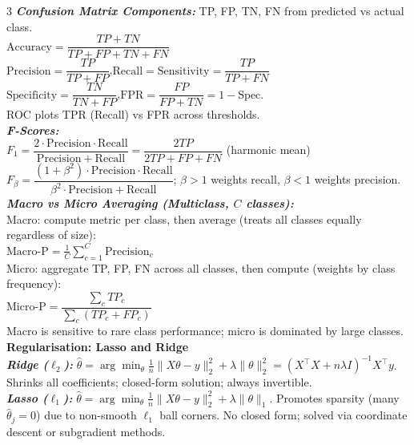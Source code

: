 \documentclass[a4paper,7pt]{article}
\begin{document}
\begin{multicols*}{3}
\textit{\textbf{Confusion Matrix Components:}} TP, FP, TN, FN from predicted vs actual class.\\
$\mathrm{Accuracy}=\dfrac{TP+TN}{TP+FP+TN+FN}$\\
$\mathrm{Precision}=\dfrac{TP}{TP+FP}$,\quad $\mathrm{Recall}=\mathrm{Sensitivity}=\dfrac{TP}{TP+FN}$\\
$\mathrm{Specificity}=\dfrac{TN}{TN+FP}$,\quad $\mathrm{FPR}=\dfrac{FP}{FP+TN}=1-\mathrm{Spec.}$\\
ROC plots TPR (Recall) vs FPR across thresholds.\\

\textit{\textbf{F-Scores:}}\\
$F_1=\dfrac{2\cdot\mathrm{Precision}\cdot\mathrm{Recall}}{\mathrm{Precision}+\mathrm{Recall}}=\dfrac{2TP}{2TP+FP+FN}$ (harmonic mean)\\
$F_\beta=\dfrac{(1+\beta^2)\cdot\mathrm{Precision}\cdot\mathrm{Recall}}{\beta^2\cdot\mathrm{Precision}+\mathrm{Recall}}$; $\beta>1$ weights recall, $\beta<1$ weights precision.\\

\textit{\textbf{Macro vs Micro Averaging (Multiclass, $C$ classes):}}\\
Macro: compute metric per class, then average (treats all classes equally regardless of size):\\
$\mathrm{Macro\text{-}P}=\frac{1}{C}\sum_{c=1}^C\mathrm{Precision}_c$\\
Micro: aggregate TP, FP, FN across all classes, then compute (weights by class frequency):\\
$\mathrm{Micro\text{-}P}=\dfrac{\sum_c TP_c}{\sum_c(TP_c+FP_c)}$\\
Macro is sensitive to rare class performance; micro is dominated by large classes.\\

\textbf{Regularisation: Lasso and Ridge}\\

\textit{\textbf{Ridge ($\ell_2$):}} $\hat\theta=\arg\min_\theta\frac{1}{n}\|X\theta-y\|_2^2+\lambda\|\theta\|_2^2=(X^\top X+n\lambda I)^{-1}X^\top y$. Shrinks all coefficients; closed-form solution; always invertible.\\

\textit{\textbf{Lasso ($\ell_1$):}} $\hat\theta=\arg\min_\theta\frac{1}{n}\|X\theta-y\|_2^2+\lambda\|\theta\|_1$. Promotes sparsity (many $\hat\theta_j=0$) due to non-smooth $\ell_1$ ball corners. No closed form; solved via coordinate descent or subgradient methods.\\


\end{multicols*}
\end{document}
